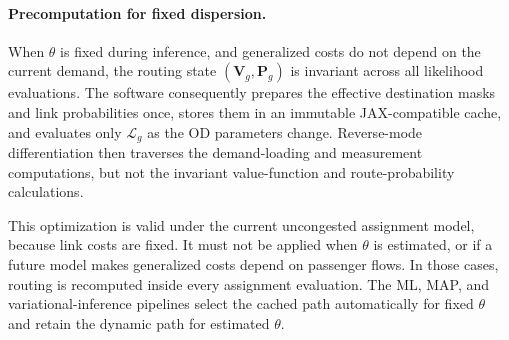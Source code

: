 \paragraph{Precomputation for fixed dispersion.}
When $\theta$ is fixed during inference, and generalized costs do not depend on
the current demand, the routing state $(\bm V_g,\bm P_g)$ is invariant across
all likelihood evaluations. The software consequently prepares the effective
destination masks and link probabilities once, stores them in an immutable
JAX-compatible cache, and evaluates only $\mathcal L_g$ as the OD parameters
change. Reverse-mode differentiation then traverses the demand-loading and
measurement computations, but not the invariant value-function and
route-probability calculations.

This optimization is valid under the current uncongested assignment model,
because link costs are fixed. It must not be applied when $\theta$ is estimated,
or if a future model makes generalized costs depend on passenger flows. In
those cases, routing is recomputed inside every assignment evaluation. The ML,
MAP, and variational-inference pipelines select the cached path automatically
for fixed $\theta$ and retain the dynamic path for estimated $\theta$.

